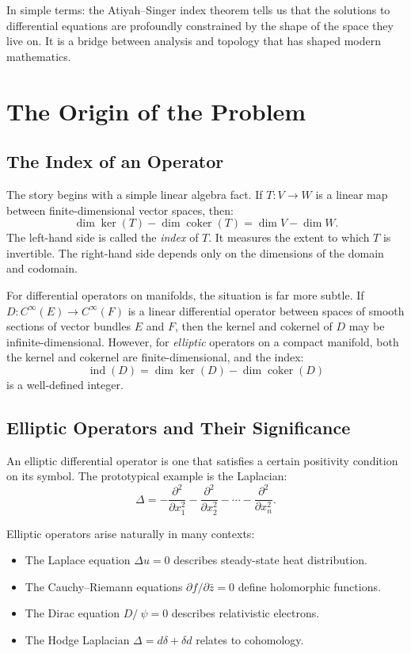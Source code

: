 In simple terms: the Atiyah--Singer index theorem tells us that the solutions to differential equations are profoundly constrained by the shape of the space they live on. It is a bridge between analysis and topology that has shaped modern mathematics.

\section{The Origin of the Problem}

\subsection{The Index of an Operator}

The story begins with a simple linear algebra fact. If $T: V \to W$ is a linear map between finite-dimensional vector spaces, then:
\[
\dim \ker(T) - \dim \operatorname{coker}(T) = \dim V - \dim W.
\]
The left-hand side is called the \emph{index} of $T$. It measures the extent to which $T$ is invertible. The right-hand side depends only on the dimensions of the domain and codomain.

For differential operators on manifolds, the situation is far more subtle. If $D: C^\infty(E) \to C^\infty(F)$ is a linear differential operator between spaces of smooth sections of vector bundles $E$ and $F$, then the kernel and cokernel of $D$ may be infinite-dimensional. However, for \emph{elliptic} operators on a compact manifold, both the kernel and cokernel are finite-dimensional, and the index:
\[
\operatorname{ind}(D) = \dim \ker(D) - \dim \operatorname{coker}(D)
\]
is a well-defined integer.

\subsection{Elliptic Operators and Their Significance}

An elliptic differential operator is one that satisfies a certain positivity condition on its symbol. The prototypical example is the Laplacian:
\[
\Delta = -\frac{\partial^2}{\partial x_1^2} - \frac{\partial^2}{\partial x_2^2} - \cdots - \frac{\partial^2}{\partial x_n^2}.
\]

Elliptic operators arise naturally in many contexts:
\begin{itemize}
\item The Laplace equation $\Delta u = 0$ describes steady-state heat distribution.
\item The Cauchy--Riemann equations $\partial f / \partial \bar z = 0$ define holomorphic functions.
\item The Dirac equation $D\!\!\!\!/ \ \psi = 0$ describes relativistic electrons.
\item The Hodge Laplacian $\Delta = d\delta + \delta d$ relates to cohomology.
\end{itemize}

